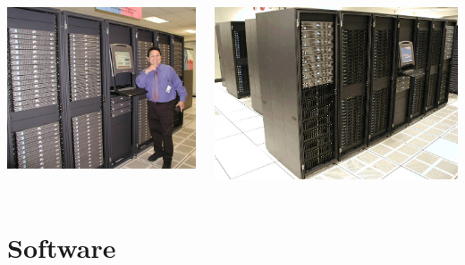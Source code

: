 \documentclass[compress,12pt]{beamer}
\begin{document}
\begin{frame}
{\begin{columns}
       { \centerline{\includegraphics[width=\textwidth]{figures/lonestar}}  }
       { \centerline{\includegraphics[width=\textwidth]{figures/lonestar2}} }
    \end{columns}
  }
\end{frame}
 


\section{Software}

\end{document}
